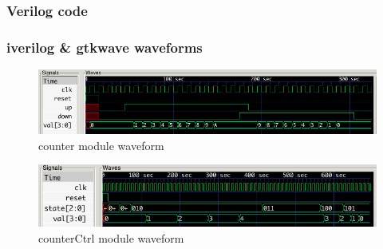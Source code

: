 \documentclass{article}
\begin{document}
    \subsubsection{Verilog code}
      
      

      
      

      
      

      
      

      
      

    \subsubsection{iverilog \& gtkwave waveforms}
      \begin{figure}[H]
        \centering
        \includegraphics[width=0.75\linewidth]{figures/gtkwave/counter_gtkwave.png}
        \caption{counter module waveform}
        \label{fig:counter_gtkwave}
      \end{figure}

      \begin{figure}[H]
        \centering
        \includegraphics[width=0.75\linewidth]{figures/gtkwave/counterCtrl_gtkwave.png}
        \caption{counterCtrl module waveform}
        \label{fig:counterCtrl_gtkwave}
      \end{figure}
\end{document}
